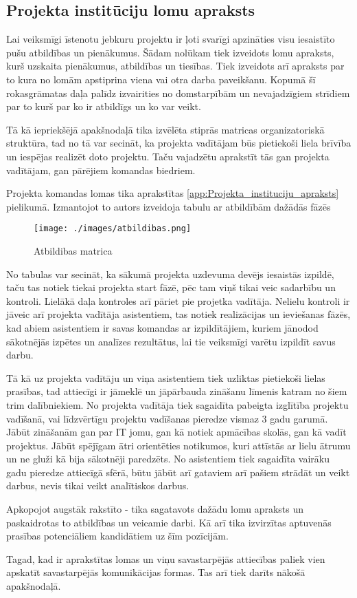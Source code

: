 \subsection{Projekta institūciju lomu apraksts}
Lai veiksmīgi īstenotu jebkuru projektu ir ļoti svarīgi apzināties visu iesaistīto pušu
atbildības un pienākumus. Šādam nolūkam tiek izveidots lomu apraksts, kurš uzskaita 
pienākumus, atbildības un tiesības. Tiek izveidots arī apraksts par to kura no lomām apstiprina
viena vai otra darba paveikšanu. Kopumā šī rokasgrāmatas daļa palīdz izvairities no domstarpībām
un nevajadzīgiem strīdiem par to kurš par ko ir atbildīgs un ko var veikt.
\par
Tā kā iepriekšējā apakšnodaļā tika izvēlēta stiprās matricas organizatoriskā struktūra, tad
no tā var secināt, ka projekta vadītājam būs pietiekoši liela brīvība un iespējas realizēt doto
projektu. Taču vajadzētu aprakstīt tās gan projekta vadītājam, gan pārējiem komandas biedriem.
\par
Projekta komandas lomas tika aprakstītas \ref{app:Projekta_instituciju_apraksts} pielikumā. Izmantojot
to autors izveidoja tabulu ar atbildībām dažādās fāzēs
\begin{figure}[h]
  \centering
  \texttt{[image: ./images/atbildibas.png]}
  \caption{Atbildibas matrica}
\end{figure}
No tabulas var secināt, ka sākumā projekta uzdevuma devējs iesaistās izpildē, taču tas notiek tiekai
projekta start fāzē, pēc tam viņš tikai veic sadarbību un kontroli. Lielākā daļa kontroles arī pāriet 
pie projetka vadītāja. Nelielu kontroli ir jāveic arī projekta vadītāja asistentiem, tas notiek
realizācijas un ieviešanas fāzēs, kad abiem asistentiem ir savas komandas ar izpildītājiem, kuriem 
jānodod sākotnējās izpētes un analīzes rezultātus, lai tie veiksmīgi varētu izpildīt savus darbu.
\par
Tā kā uz projekta vadītāju un viņa asistentiem tiek uzliktas pietiekoši lielas prasības, tad attiecīgi
ir jāmeklē un jāpārbauda zināšanu līmenis katram no šiem trim dalībniekiem. No projekta vadītāja tiek
sagaidīta pabeigta izglītība projektu vadīšanā, vai līdzvērtīgu projektu vadīšanas pieredze vismaz 3
gadu garumā. Jābūt zināšanām gan par IT jomu, gan kā notiek apmācības skolās, gan kā vadīt projektus.
Jābūt spējīgam ātri orientēties notikumos, kuri attīstās ar lielu ātrumu un ne gluži kā bija sākotnēji
paredzēts. No asistentiem tiek sagaidīta vairāku gadu pieredze attiecīgā sfērā, būtu jābūt arī gataviem
arī pašiem strādāt un veikt darbus, nevis tikai veikt analītiskos darbus.
\par
Apkopojot augstāk rakstīto - tika sagatavots dažādu lomu apraksts un paskaidrotas to atbildības un veicamie
darbi. Kā arī tika izvirzītas aptuvenās prasības potenciāliem kandidātiem uz šīm pozīcijām.
\par
Tagad, kad ir aprakstītas lomas un viņu savastarpējās attiecības paliek vien apskatīt savastarpējās
komunikācijas formas. Tas arī tiek darīts nākošā apakšnodaļā.
